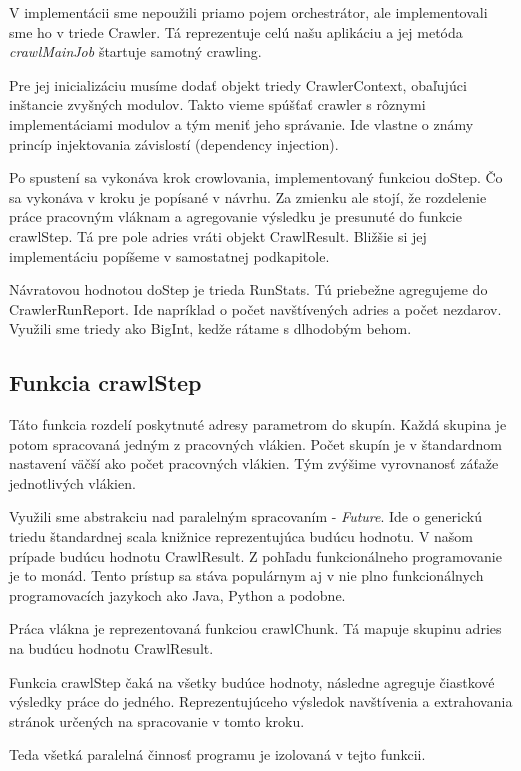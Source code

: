 V implementácii sme nepoužili priamo pojem orchestrátor, ale implementovali sme ho v triede Crawler. Tá reprezentuje celú našu aplikáciu a jej metóda \textit{crawlMainJob}  štartuje samotný crawling. 

Pre jej inicializáciu musíme dodať objekt triedy CrawlerContext, obaľujúci inštancie zvyšných modulov. Takto vieme spúšťať crawler s rôznymi implementáciami modulov a tým meniť jeho správanie. Ide vlastne o známy princíp injektovania závislostí (dependency injection). 

Po spustení sa vykonáva krok crowlovania, implementovaný funkciou doStep. Čo sa vykonáva v kroku je popísané v návrhu. Za zmienku ale stojí, že rozdelenie práce pracovným vláknam a agregovanie výsledku je presunuté do funkcie crawlStep. Tá pre pole adries vráti objekt CrawlResult. Bližšie si jej implementáciu popíšeme v samostatnej podkapitole. 

Návratovou hodnotou doStep je trieda RunStats. Tú priebežne agregujeme do CrawlerRunReport. Ide napríklad o počet navštívených adries a počet nezdarov. Využili sme triedy ako BigInt, kedže rátame s dlhodobým behom. 

\subsection{Funkcia crawlStep}
Táto funkcia rozdelí poskytnuté adresy parametrom do skupín. Každá skupina je potom spracovaná jedným z pracovných vlákien. Počet skupín je v štandardnom nastavení väčší ako počet pracovných vlákien. Tým zvýšime vyrovnanosť záťaže jednotlivých vlákien.

Využili sme abstrakciu nad paralelným spracovaním - \textit{Future}. Ide o generickú triedu štandardnej scala knižnice reprezentujúca budúcu hodnotu. V našom prípade budúcu hodnotu CrawlResult. Z pohľadu funkcionálneho programovanie je to monád. Tento prístup sa stáva populárnym aj v nie plno funkcionálnych programovacích jazykoch ako Java, Python a podobne. 

Práca vlákna je reprezentovaná funkciou crawlChunk. Tá mapuje skupinu adries na budúcu hodnotu CrawlResult. 

Funkcia crawlStep čaká na všetky budúce hodnoty, následne agreguje čiastkové výsledky práce do jedného. Reprezentujúceho výsledok navštívenia a extrahovania stránok určených na spracovanie v tomto kroku. 

Teda všetká paralelná činnosť programu je izolovaná v tejto funkcii. 

